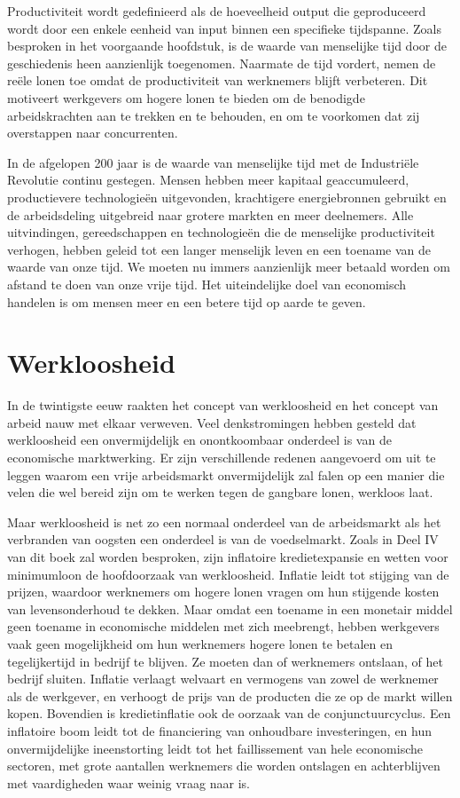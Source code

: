 \documentclass[
  a5paper,
  smalldemyvopaper,11pt,twoside,onecolumn,openright,extrafontsizes,
hidelinks]{memoir}
\begin{document}
Productiviteit wordt gedefinieerd als de hoeveelheid output die
geproduceerd wordt door een enkele eenheid van input binnen een
specifieke tijdspanne. Zoals besproken in het voorgaande hoofdstuk, is
de waarde van menselijke tijd door de geschiedenis heen aanzienlijk
toegenomen. Naarmate de tijd vordert, nemen de reële lonen toe omdat de
productiviteit van werknemers blijft verbeteren. Dit motiveert
werkgevers om hogere lonen te bieden om de benodigde arbeidskrachten aan
te trekken en te behouden, en om te voorkomen dat zij overstappen naar
concurrenten.

In de afgelopen 200 jaar is de waarde van menselijke tijd met de
Industriële Revolutie continu gestegen. Mensen hebben meer kapitaal
geaccumuleerd, productievere technologieën uitgevonden, krachtigere
energiebronnen gebruikt en de arbeidsdeling uitgebreid naar grotere
markten en meer deelnemers. Alle uitvindingen, gereedschappen en
technologieën die de menselijke productiviteit verhogen, hebben geleid
tot een langer menselijk leven en een toename van de waarde van onze
tijd. We moeten nu immers aanzienlijk meer betaald worden om afstand te
doen van onze vrije tijd. Het uiteindelijke doel van economisch handelen
is om mensen meer en een betere tijd op aarde te geven.

\section{Werkloosheid}\label{werkloosheid}

In de twintigste eeuw raakten het concept van werkloosheid en het
concept van arbeid nauw met elkaar verweven. Veel denkstromingen hebben
gesteld dat werkloosheid een onvermijdelijk en onontkoombaar onderdeel
is van de economische marktwerking. Er zijn verschillende redenen
aangevoerd om uit te leggen waarom een vrije arbeidsmarkt onvermijdelijk
zal falen op een manier die velen die wel bereid zijn om te werken tegen
de gangbare lonen, werkloos laat.

Maar werkloosheid is net zo een normaal onderdeel van de arbeidsmarkt
als het verbranden van oogsten een onderdeel is van de voedselmarkt.
Zoals in Deel IV van dit boek zal worden besproken, zijn inflatoire
kredietexpansie en wetten voor minimumloon de hoofdoorzaak van
werkloosheid. Inflatie leidt tot stijging van de prijzen, waardoor
werknemers om hogere lonen vragen om hun stijgende kosten van
levensonderhoud te dekken. Maar omdat een toename in een monetair middel
geen toename in economische middelen met zich meebrengt, hebben
werkgevers vaak geen mogelijkheid om hun werknemers hogere lonen te
betalen en tegelijkertijd in bedrijf te blijven. Ze moeten dan of
werknemers ontslaan, of het bedrijf sluiten. Inflatie verlaagt welvaart
en vermogens van zowel de werknemer als de werkgever, en verhoogt de
prijs van de producten die ze op de markt willen kopen. Bovendien is
kredietinflatie ook de oorzaak van de conjunctuurcyclus. Een inflatoire
boom leidt tot de financiering van onhoudbare investeringen, en hun
onvermijdelijke ineenstorting leidt tot het faillissement van hele
economische sectoren, met grote aantallen werknemers die worden
ontslagen en achterblijven met vaardigheden waar weinig vraag naar is.
\end{document}
